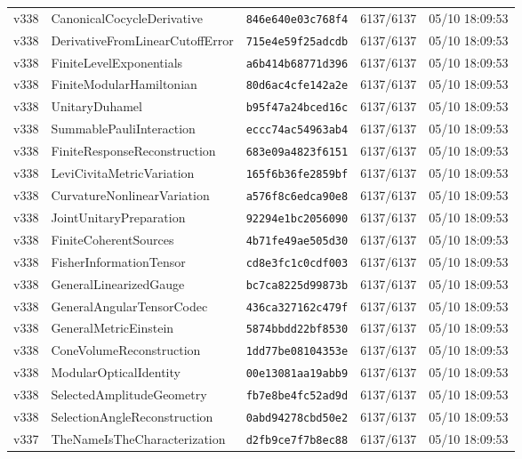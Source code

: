 \documentclass[11pt]{article}
\theoremstyle{definition}\newtheorem{deriv}{Derivação}
\begin{document}
{\begin{longtable}{@{}lllll@{}}
v338 & CanonicalCocycleDerivative & \texttt{846e640e03c768f4} & 6137/6137 & 05/10 18:09:53 \\
v338 & DerivativeFromLinearCutoffError & \texttt{715e4e59f25adcdb} & 6137/6137 & 05/10 18:09:53 \\
v338 & FiniteLevelExponentials & \texttt{a6b414b68771d396} & 6137/6137 & 05/10 18:09:53 \\
v338 & FiniteModularHamiltonian & \texttt{80d6ac4cfe142a2e} & 6137/6137 & 05/10 18:09:53 \\
v338 & UnitaryDuhamel & \texttt{b95f47a24bced16c} & 6137/6137 & 05/10 18:09:53 \\
v338 & SummablePauliInteraction & \texttt{eccc74ac54963ab4} & 6137/6137 & 05/10 18:09:53 \\
v338 & FiniteResponseReconstruction & \texttt{683e09a4823f6151} & 6137/6137 & 05/10 18:09:53 \\
v338 & LeviCivitaMetricVariation & \texttt{165f6b36fe2859bf} & 6137/6137 & 05/10 18:09:53 \\
v338 & CurvatureNonlinearVariation & \texttt{a576f8c6edca90e8} & 6137/6137 & 05/10 18:09:53 \\
v338 & JointUnitaryPreparation & \texttt{92294e1bc2056090} & 6137/6137 & 05/10 18:09:53 \\
v338 & FiniteCoherentSources & \texttt{4b71fe49ae505d30} & 6137/6137 & 05/10 18:09:53 \\
v338 & FisherInformationTensor & \texttt{cd8e3fc1c0cdf003} & 6137/6137 & 05/10 18:09:53 \\
v338 & GeneralLinearizedGauge & \texttt{bc7ca8225d99873b} & 6137/6137 & 05/10 18:09:53 \\
v338 & GeneralAngularTensorCodec & \texttt{436ca327162c479f} & 6137/6137 & 05/10 18:09:53 \\
v338 & GeneralMetricEinstein & \texttt{5874bbdd22bf8530} & 6137/6137 & 05/10 18:09:53 \\
v338 & ConeVolumeReconstruction & \texttt{1dd77be08104353e} & 6137/6137 & 05/10 18:09:53 \\
v338 & ModularOpticalIdentity & \texttt{00e13081aa19abb9} & 6137/6137 & 05/10 18:09:53 \\
v338 & SelectedAmplitudeGeometry & \texttt{fb7e8be4fc52ad9d} & 6137/6137 & 05/10 18:09:53 \\
v338 & SelectionAngleReconstruction & \texttt{0abd94278cbd50e2} & 6137/6137 & 05/10 18:09:53 \\
v337 & TheNameIsTheCharacterization & \texttt{d2fb9ce7f7b8ec88} & 6137/6137 & 05/10 18:09:53 \\

\end{longtable}}
\end{document}
